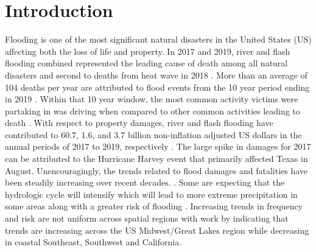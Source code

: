 \section{Introduction}

Flooding is one of the most significant natural disasters in the United States (US) affecting both the loss of life and property. 
In 2017 and 2019, river and flash flooding combined represented the leading cause of death among all natural disasters and second to deaths from heat wave in 2018 \cite{national_weather_service_2020,national_weather_service_2019,national_weather_service_2018}. 
More than an average of 104 deaths per year are attributed to flood events from the 10 year period ending in 2019 \cite{us_department_of_commerce_2020}. 
Within that 10 year window, the most common activity victims were partaking in was driving when compared to other common activities leading to death \cite{us_department_of_commerce_2020}.
With respect to property damages, river and flash flooding have contributed to 60.7, 1.6, and 3.7 billion non-inflation adjusted US dollars in the annual periods of 2017 to 2019, respectively \cite{national_weather_service_2020,national_weather_service_2019,national_weather_service_2018}. 
The large spike in damages for 2017 can be attributed to the Hurricane Harvey event that primarily affected Texas in August. 
Unencouragingly, the trends related to flood damages and fatalities have been steadily increasing over recent decades. \cite{mallakpour2015changing,downton2005reanalysis,kunkel1999temporal,pielke2000precipitation,corringham2019effect}. 
Some are expecting that the hydrologic cycle will intensify which will lead to more extreme precipitation in some areas along with a greater risk of flooding \cite{tabari2020climate,milly2002increasing,wing2018estimates}. 
Increasing trends in frequency and risk are not uniform across spatial regions with work by  indicating that trends are increasing across the US Midwest/Great Lakes region while decreasing in coastal Southeast, Southwest and California.


